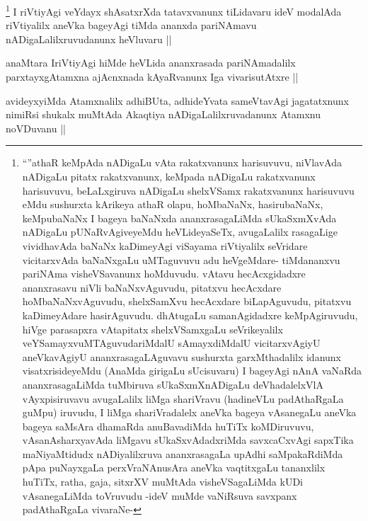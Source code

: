 \begin{artha}
\footnote{``\stext''athaR keMpAda nADigaLu vAta rakatxvanunx harisuvuvu, niVlavAda nADigaLu pitatx rakatxvanunx, keMpada nADigaLu rakatxvanunx harisuvuvu, beLaLxgiruva nADigaLu shelxVSamx rakatxvanunx harisuvuvu eMdu sushurxta kArikeya athaR olapu, hoMbaNaNx, hasirubaNaNx, keMpubaNaNx I bageya baNaNxda ananxrasagaLiMda sUkaSxmXvAda nADigaLu pUNaRvAgiveyeMdu heVLideyaSeTx, avugaLalilx rasagaLige vividhavAda baNaNx kaDimeyAgi viSayama riVtiyalilx seVridare vicitarxvAda baNaNxgaLu uMTaguvuvu adu heVgeMdare- tiMdananxvu pariNAma visheVSavanunx hoMduvudu. vAtavu hecAcxgidadxre ananxrasavu niVli baNaNxvAguvudu, pitatxvu hecAcxdare hoMbaNaNxvAguvudu, shelxSamXvu hecAcxdare biLapAguvudu, pitatxvu kaDimeyAdare hasirAguvudu. dhAtugaLu samanAgidadxre keMpAgiruvudu, hiVge parasapxra vAtapitatx shelxVSamxgaLu seVrikeyalilx veYSamayxvuMTAguvudariMdalU sAmayxdiMdalU vicitarxvAgiyU aneVkavAgiyU ananxrasagaLAguvavu sushurxta garxMthadalilx idanunx visatxrisideyeMdu (AnaMda girigaLu sUcisuvaru) I bageyAgi nAnA vaNaRda ananxrasagaLiMda tuMbiruva sUkaSxmXnADigaLu deVhadalelxVlA vAyxpisiruvavu avugaLalilx liMga shariVravu (hadineVLu padAthaRgaLa guMpu) iruvudu, I liMga shariVradalelx aneVka bageya vAsanegaLu aneVka bageya saMsAra dhamaRda anuBavadiMda huTiTx koMDiruvuvu, vAsanAsharxyavAda liMgavu sUkaSxvAdadxriMda savxcaCxvAgi sapxTika maNiyaMtidudx nADiyalilxruva ananxrasagaLa upAdhi saMpakaRdiMda pApa puNayxgaLa perxVraNAnusAra aneVka vaqtitxgaLu tananxlilx huTiTx, ratha, gaja, sitxrXV muMtAda visheVSagaLiMda kUDi vAsanegaLiMda toVruvudu -ideV muMde vaNiRsuva savxpanx padAthaRgaLa vivaraNe-}
I riVtiyAgi veYdayx shAsatxrXda tatavxvanunx tiLidavaru ideV modalAda riVtiyalilx aneVka bageyAgi tiMda ananxda pariNAmavu nADigaLalilxruvudanunx heVluvaru ||
\end{artha}

\begin{artha}
anaMtara IriVtiyAgi hiMde heVLida ananxrasada pariNAmadalilx parxtayxgAtamxna ajAcnxnada kAyaRvanunx Iga vivarisutAtxre ||
\end{artha}


\begin{artha}
avideyxyiMda Atamxnalilx adhiBUta, adhideYvata sameVtavAgi jagatatxnunx nimiRsi shukalx muMtAda Akaqtiya nADigaLalilxruvadanunx Atamxnu noVDuvanu ||
\end{artha}

